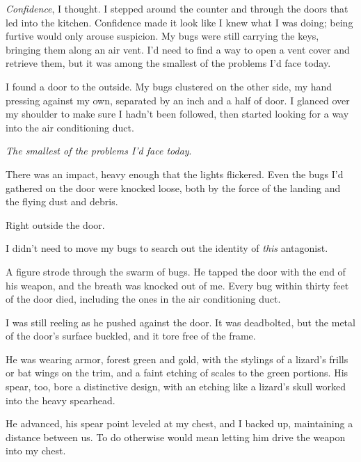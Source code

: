 \emph{Confidence}, I thought.  I stepped around the counter and through the doors that led into the kitchen.  Confidence made it look like I knew what I was doing; being furtive would only arouse suspicion.  My bugs were still carrying the keys, bringing them along an air vent.  I'd need to find a way to open a vent cover and retrieve them, but it was among the smallest of the problems I'd face today.



I found a door to the outside.  My bugs clustered on the other side, my hand pressing against my own, separated by an inch and a half of door.  I glanced over my shoulder to make sure I hadn't been followed, then started looking for a way into the air conditioning duct.



\emph{The smallest of the problems I'd face today}.



There was an impact, heavy enough that the lights flickered.  Even the bugs I'd gathered on the door were knocked loose, both by the force of the landing and the flying dust and debris.



Right outside the door.



I didn't need to move my bugs to search out the identity of \emph{this} antagonist.



A figure strode through the swarm of bugs.   He tapped the door with the end of his weapon, and the breath was knocked out of me.  Every bug within thirty feet of the door died, including the ones in the air conditioning duct.



I was still reeling as he pushed against the door.  It was deadbolted, but the metal of the door's surface buckled, and it tore free of the frame.



He was wearing armor, forest green and gold, with the stylings of a lizard's frills or bat wings on the trim, and a faint etching of scales to the green portions.  His spear, too, bore a distinctive design, with an etching like a lizard's skull worked into the heavy spearhead.



He advanced, his spear point leveled at my chest, and I backed up, maintaining a distance between us.  To do otherwise would mean letting him drive the weapon into my chest.



